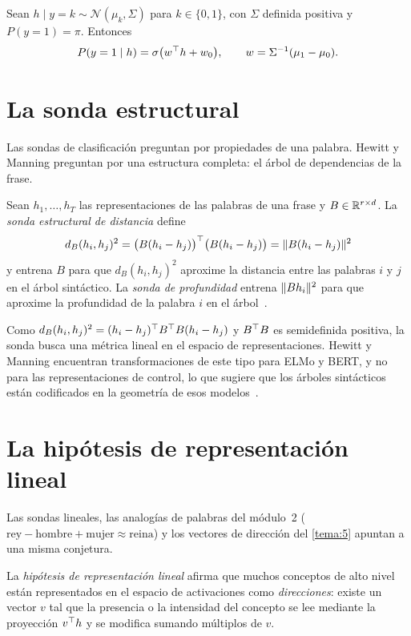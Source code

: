 \begin{proposicion}\label{prop:lda}
Sean $h\mid y=k\sim\mathcal{N}(\mu_k,\Sigma)$ para $k\in\{0,1\}$, con $\Sigma$ definida positiva y $P(y=1)=\pi$. Entonces
\[
P(y=1\mid h)=\sigma\bigl(w^{\top} h+w_0\bigr),\qquad w=\Sigma^{-1}(\mu_1-\mu_0).
\]
\end{proposicion}

\addtocounter{definicion}{1}%

\section{La sonda estructural}

Las sondas de clasificación preguntan por propiedades de una palabra. Hewitt y Manning preguntan por una estructura completa: el árbol de dependencias de la frase.

\begin{definicion}\label{def:estructural}
Sean $h_1,\dots,h_T$ las representaciones de las palabras de una frase y $B\in\mathbb{R}^{r\times d}$. La \emph{sonda estructural de distancia} define
\[
d_B(h_i,h_j)^{2}=\bigl(B(h_i-h_j)\bigr)^{\top}\bigl(B(h_i-h_j)\bigr)=\lVert B(h_i-h_j)\rVert^{2}
\]
y entrena $B$ para que $d_B(h_i,h_j)^2$ aproxime la distancia entre las palabras $i$ y $j$ en el árbol sintáctico. La \emph{sonda de profundidad} entrena $\lVert Bh_i\rVert^{2}$ para que aproxime la profundidad de la palabra $i$ en el árbol~\cite{hewitt-manning}.
\end{definicion}

Como $d_B(h_i,h_j)^2=(h_i-h_j)^{\top} B^{\top} B(h_i-h_j)$ y $B^{\top} B$ es semidefinida positiva, la sonda busca una métrica lineal en el espacio de representaciones. Hewitt y Manning encuentran transformaciones de este tipo para ELMo y BERT, y no para las representaciones de control, lo que sugiere que los árboles sintácticos están codificados en la geometría de esos modelos~\cite{hewitt-manning}.

\section{La hipótesis de representación lineal}

Las sondas lineales, las analogías de palabras del módulo~2 ($\text{rey}-\text{hombre}+\text{mujer}\approx\text{reina}$) y los vectores de dirección del \cref{tema:5} apuntan a una misma conjetura.

\begin{definicion}\label{def:hrl}
La \emph{hipótesis de representación lineal} afirma que muchos conceptos de alto nivel están representados en el espacio de activaciones como \emph{direcciones}: existe un vector $v$ tal que la presencia o la intensidad del concepto se lee mediante la proyección $v^{\top} h$ y se modifica sumando múltiplos de $v$.
\end{definicion}

